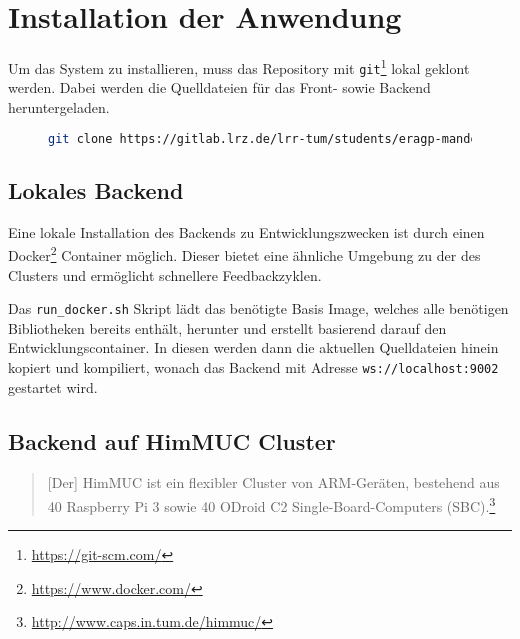 \section{Installation der Anwendung}

Um das System zu installieren, muss das Repository mit \verb|git|\footnote{\url{https://git-scm.com/}} lokal geklont werden. Dabei werden die Quelldateien für
das Front- sowie Backend heruntergeladen.

\begin{figure}[h!]
	\begin{lstlisting}[language=bash, caption={Klonen des Repositorys}]
git clone https://gitlab.lrz.de/lrr-tum/students/eragp-mandelbrot.git
        \end{lstlisting}
\end{figure}

\subsection{Lokales Backend}
Eine lokale Installation des Backends zu Entwicklungszwecken ist durch einen Docker\footnote{\url{https://www.docker.com/}} Container möglich.
Dieser bietet eine ähnliche Umgebung zu der des Clusters und ermöglicht schnellere Feedbackzyklen.


Das \verb|run_docker.sh| Skript lädt das benötigte Basis Image, welches alle benötigen Bibliotheken bereits enthält, herunter und erstellt basierend darauf
den Entwicklungscontainer. In diesen werden dann die aktuellen Quelldateien hinein kopiert und kompiliert, wonach das Backend mit Adresse
\verb|ws://localhost:9002| gestartet wird.

\subsection{Backend auf HimMUC Cluster}

\begin{quotation}
	[Der] HimMUC ist ein flexibler Cluster von ARM-Geräten, bestehend aus 40 Raspberry Pi 3 sowie 40 ODroid C2 Single-Board-Computers (SBC).\footnote{\url{http://www.caps.in.tum.de/himmuc/}}
\end{quotation}

